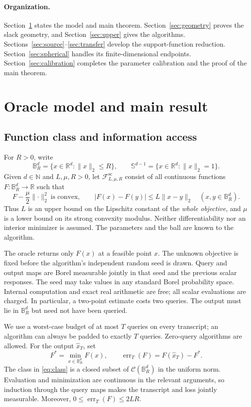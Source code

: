 \documentclass[11pt]{article}
\newcommand{\R}{\mathbb{R}}
\newcommand{\B}{\mathbb{B}}
\newcommand{\Sph}{\mathbb{S}}
\newcommand{\cF}{\mathcal{F}}
\newcommand{\norm}[1]{\lVert #1\rVert_2}
\newcommand{\err}{\operatorname{err}}
\theoremstyle{plain}
\theoremstyle{definition}
\begin{document}
\paragraph{Organization.}
Section~\ref{sec:model} states the model and main theorem.
Section~\ref{sec:geometry} proves the slack geometry, and
Section~\ref{sec:upper} gives the algorithms.
Sections~\ref{sec:source}--\ref{sec:transfer} develop the
support-function reduction. Section~\ref{sec:spherical} handles its
finite-dimensional endpoints. Section~\ref{sec:calibration} completes
the parameter calibration and the proof of the main theorem.

\section{Oracle model and main result}\label{sec:model}

\subsection{Function class and information access}

For $R>0$, write
\[
 \B_R^d=\{x\in\R^d:\norm{x}\le R\},
 \qquad \Sph^{d-1}=\{x\in\R^d:\norm{x}=1\}.
\]
Given $d\in\mathbb N$ and $L,\mu,R>0$, let
$\cF^{\mathrm{sc}}_{L,\mu,R}$ consist of all continuous functions
$F:\B_R^d\to\R$ such that
\begin{equation}\label{eq:class}
 F-\frac{\mu}{2}\norm{\cdot}^2\ \text{is convex},
 \qquad
 |F(x)-F(y)|\le L\norm{x-y}\quad(x,y\in\B_R^d).
\end{equation}
Thus $L$ is an upper bound on the Lipschitz constant of the
\emph{whole objective}, and $\mu$ is a lower bound on its strong
convexity modulus. Neither differentiability nor an interior minimizer
is assumed. The parameters and the ball are known to the algorithm.

The oracle returns only $F(x)$ at a feasible point $x$. The unknown
objective is fixed before the algorithm's independent random seed is
drawn. Query and output maps are Borel measurable jointly in that seed
and the previous scalar responses. The seed may take values in any
standard Borel probability space. Internal computation and exact real
arithmetic are free; all scalar evaluations are charged. In particular,
a two-point estimate costs two queries. The output must lie in
$\B_R^d$ but need not have been queried.

We use a worst-case budget of at most $T$ queries on every transcript;
an algorithm can always be padded to exactly $T$ queries. Zero-query
algorithms are allowed. For the output $\widehat x_T$, set
\[
 F^*=\min_{x\in\B_R^d}F(x),
 \qquad \err_T(F)=F(\widehat x_T)-F^*.
\]
The class in \eqref{eq:class} is a closed subset of
$\mathcal C(\B_R^d)$ in the uniform norm. Evaluation and minimization
are continuous in the relevant arguments, so induction through the
query maps makes the transcript and loss jointly measurable.
Moreover, $0\le\err_T(F)\le2LR$.
\end{document}
